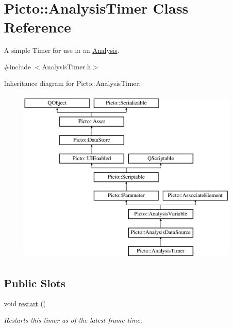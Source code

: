 \hypertarget{class_picto_1_1_analysis_timer}{\section{Picto\-:\-:Analysis\-Timer Class Reference}
\label{class_picto_1_1_analysis_timer}
}


A simple Timer for use in an \hyperlink{class_picto_1_1_analysis}{Analysis}.  




{\ttfamily \#include $<$Analysis\-Timer.\-h$>$}

Inheritance diagram for Picto\-:\-:Analysis\-Timer\-:\begin{figure}[H]
\begin{center}
\leavevmode
\includegraphics[height=9.000000cm]{class_picto_1_1_analysis_timer}
\end{center}
\end{figure}
\subsection*{Public Slots}
\begin{DoxyCompactItemize}
\item 
\hypertarget{class_picto_1_1_analysis_timer_a97bf799a17780d9502fa8a7193115312}{void \hyperlink{class_picto_1_1_analysis_timer_a97bf799a17780d9502fa8a7193115312}{restart} ()}\label{class_picto_1_1_analysis_timer_a97bf799a17780d9502fa8a7193115312}

\begin{DoxyCompactList}\small\item\em Restarts this timer as of the latest frame time. \end{DoxyCompactList}\end{DoxyCompactItemize}
